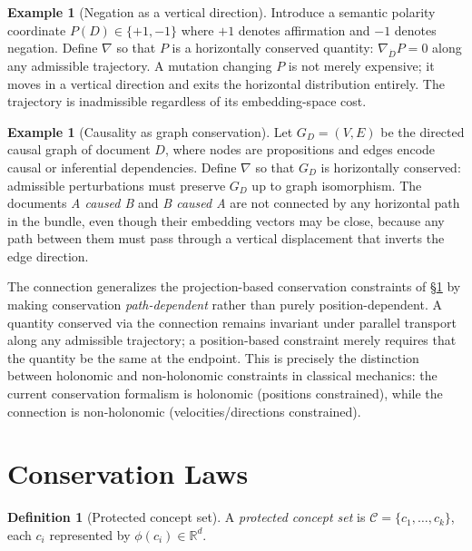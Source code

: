 \documentclass[12pt, a4paper]{article}
\theoremstyle{plain}
\theoremstyle{definition}
\newtheorem{definition}[theorem]{Definition}
\newtheorem{example}[theorem]{Example}
\theoremstyle{remark}
\newcommand{\bR}{\mathbb{R}}
\newcommand{\connD}{\nabla}
\begin{document}
\begin{example}[Negation as a vertical direction]
Introduce a semantic polarity coordinate $P(D) \in \{+1, -1\}$ where $+1$
denotes affirmation and $-1$ denotes negation.  Define $\connD$ so that
$P$ is a horizontally conserved quantity: $\connD_{\dot D} P = 0$ along any
admissible trajectory.  A mutation changing $P$ is not merely expensive; it
moves in a vertical direction and exits the horizontal distribution entirely.
The trajectory is inadmissible regardless of its embedding-space cost.
\end{example}

\begin{example}[Causality as graph conservation]
Let $G_D = (V, E)$ be the directed causal graph of document $D$, where nodes
are propositions and edges encode causal or inferential dependencies.  Define
$\connD$ so that $G_D$ is horizontally conserved: admissible perturbations
must preserve $G_D$ up to graph isomorphism.  The documents
\emph{A caused B} and \emph{B caused A} are not connected by any horizontal
path in the bundle, even though their embedding vectors may be close, because
any path between them must pass through a vertical displacement that inverts
the edge direction.
\end{example}

The connection generalizes the projection-based conservation constraints of
\S\ref{sec:conservation} by making conservation \emph{path-dependent} rather
than purely position-dependent.  A quantity conserved via the connection remains
invariant under parallel transport along any admissible trajectory; a
position-based constraint merely requires that the quantity be the same at the
endpoint.  This is precisely the distinction between holonomic and non-holonomic
constraints in classical mechanics: the current conservation formalism is
holonomic (positions constrained), while the connection is non-holonomic
(velocities/directions constrained).


\section{Conservation Laws}
\label{sec:conservation}

\begin{definition}[Protected concept set]
\label{def:protected}
A \emph{protected concept set} is
$\mathcal{C} = \{c_1, \ldots, c_k\}$, each $c_i$ represented by
$\phi(c_i) \in \bR^d$.
\end{definition}
\end{document}
